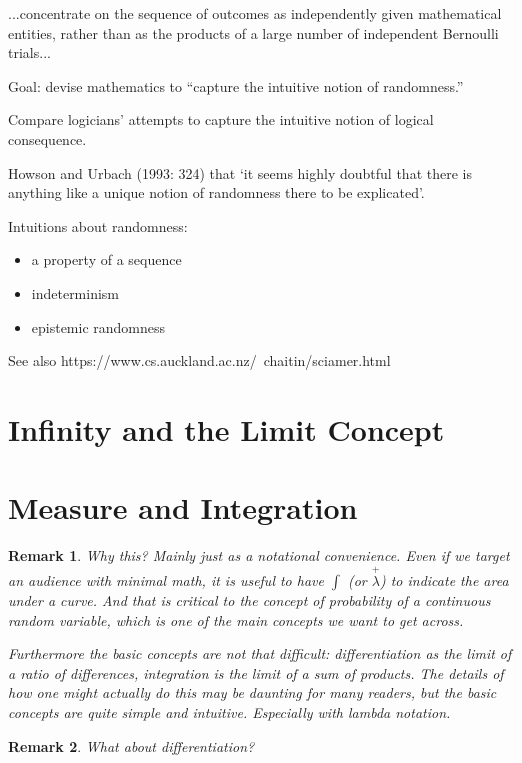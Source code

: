 \documentclass[reqno,12pt]{article}
\numberwithin{equation}{subsection}
\newtheorem{remark}{Remark}
\begin{document}
...concentrate on the sequence of outcomes as independently given mathematical entities, rather than as the products of a large number of independent Bernoulli trials...


Goal: devise mathematics to ``capture the intuitive notion of randomness.''

Compare logicians' attempts to capture the intuitive notion of logical consequence.

 Howson and Urbach (1993: 324) that ‘it seems highly doubtful that there is anything like a unique notion of randomness there to be explicated’.

Intuitions about randomness:

\begin{itemize}
\item a property of a sequence
\item indeterminism
\item epistemic randomness
\end{itemize}


See also https://www.cs.auckland.ac.nz/~chaitin/sciamer.html

\section{Infinity and the Limit Concept}

\section{Measure and Integration}

\begin{remark}
  Why this?  Mainly just as a notational convenience.  Even if we target an
  audience with minimal math, it is useful to have $\int$ (or
  $\overset{+}{\lambda}$) to indicate the area under a curve.  And
  that is critical to the concept of probability of a continuous
  random variable, which is one of the main concepts we want to get
  across.

  Furthermore the basic concepts are not that difficult:
  differentiation as the limit of a ratio of differences, integration
  is the limit of a sum of products.  The details of how one might
  actually do this may be daunting for many readers, but the basic
  concepts are quite simple and intuitive.  Especially with lambda
  notation.
\end{remark}

\begin{remark}
  What about differentiation?
\end{remark}
\end{document}
